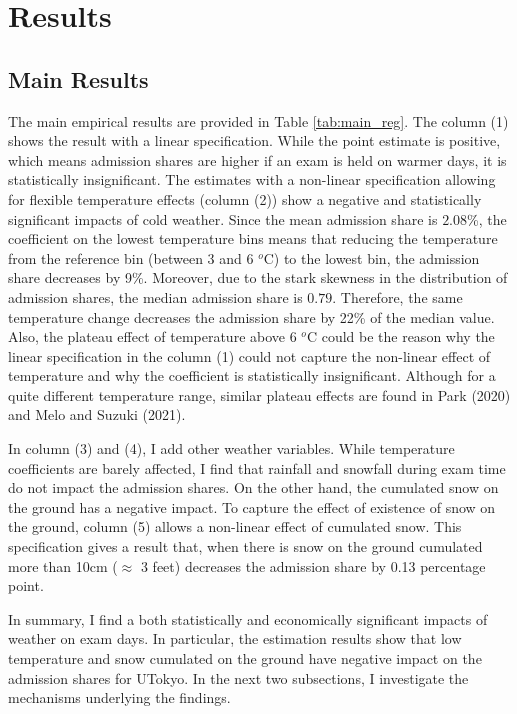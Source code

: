 \documentclass[12pt,letterpaper]{article}
\begin{document}
\section{Results}

\subsection{Main Results}

The main empirical results are provided in Table \ref{tab:main_reg}.
The column (1) shows the result with a linear specification.
While the point estimate is positive, which means admission shares are higher if an exam is held on warmer days, it is statistically insignificant. 
The estimates with a non-linear specification allowing for flexible temperature effects (column (2)) show a negative and statistically significant impacts of cold weather. 
Since the mean admission share is $2.08$\%, the coefficient on the lowest temperature bins means that reducing the temperature from the reference bin (between 3 and 6 $^o$C) to the lowest bin, the admission share decreases by 9\%.
Moreover, due to the stark skewness in the distribution of admission shares, the median admission share is $0.79$.
Therefore, the same temperature change decreases the admission share by 22\% of the median value.
Also, the plateau effect of temperature above 6 $^o$C could be the reason why the linear specification in the column (1) could not capture the non-linear effect of temperature and why the coefficient is statistically insignificant.
Although for a quite different temperature range, similar plateau effects are found in Park (2020) and Melo and Suzuki (2021).

In column (3) and (4), I add other weather variables.
While temperature coefficients are barely affected, I find that rainfall and snowfall during exam time do not impact the admission shares.
On the other hand, the cumulated snow on the ground has a negative impact.
To capture the effect of existence of snow on the ground, column (5) allows a non-linear effect of cumulated snow.
This specification gives a result that, when there is snow on the ground cumulated more than 10cm ($\approx$ 3 feet) decreases the admission share by 0.13 percentage point.

In summary, I find a both statistically and economically significant impacts of weather on exam days.
In particular, the estimation results show that low temperature and snow cumulated on the ground have negative impact on the admission shares for UTokyo.
In the next two subsections, I investigate the mechanisms underlying the findings. 
\end{document}
